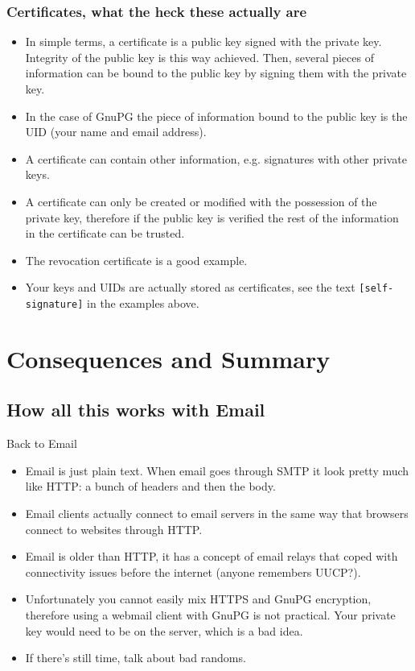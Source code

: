 \documentclass[hyperref={colorlinks=true}]{beamer}
\begin{document}
\begin{frame}[fragile]
\frametitle{Certificates, what the heck these actually are}
  \begin{itemize}
    \item In simple terms, a certificate is a public key signed with the
private key.  Integrity of the public key is this way achieved.  Then, several
pieces of information can be bound to the public key by signing them with the
private key.
    \item In the case of GnuPG the piece of information bound to the public key
is the UID (your name and email address).
    \item A certificate can contain other information, e.g. signatures with
other private keys.
    \item A certificate can only be created or modified with the possession of
the private key, therefore if the public key is verified the rest of the
information in the certificate can be trusted.
    \item The revocation certificate is a good example.
    \item Your keys and UIDs are actually stored as certificates, see the text
\verb|[self-signature]| in the examples above.
  \end{itemize}
\end{frame}

\section{Consequences and Summary}

\subsection{How all this works with Email}
\begin{frame}{Back to Email}
  \begin{itemize}
    \item Email is just plain text.  When email goes through SMTP it look
pretty much like HTTP: a bunch of headers and then the body.
    \item Email clients actually connect to email servers in the same way that
browsers connect to websites through HTTP.
    \item Email is older than HTTP, it has a concept of email relays that coped
with connectivity issues before the internet (anyone remembers UUCP?).
    \item Unfortunately you cannot easily mix HTTPS and GnuPG encryption,
therefore using a webmail client with GnuPG is not practical.  Your private key
would need to be on the server, which is a bad idea.
    \item If there's still time, talk about bad randoms.
  \end{itemize}
\end{frame}
\end{document}
